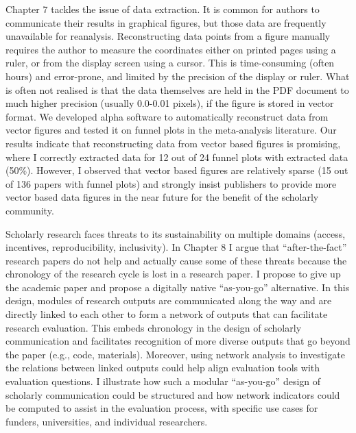 \documentclass[a5paper]{book}
\begin{document}
Chapter 7 tackles the issue of data extraction. It is common for authors
to communicate their results in graphical figures, but those data are
frequently unavailable for reanalysis. Reconstructing data points from a
figure manually requires the author to measure the coordinates either on
printed pages using a ruler, or from the display screen using a cursor.
This is time-consuming (often hours) and error-prone, and limited by the
precision of the display or ruler. What is often not realised is that
the data themselves are held in the PDF document to much higher
precision (usually 0.0-0.01 pixels), if the figure is stored in vector
format. We developed alpha software to automatically reconstruct data
from vector figures and tested it on funnel plots in the meta-analysis
literature. Our results indicate that reconstructing data from vector
based figures is promising, where I correctly extracted data for 12 out
of 24 funnel plots with extracted data (50\%). However, I observed that
vector based figures are relatively sparse (15 out of 136 papers with
funnel plots) and strongly insist publishers to provide more vector
based data figures in the near future for the benefit of the scholarly
community.

Scholarly research faces threats to its sustainability on multiple
domains (access, incentives, reproducibility, inclusivity). In Chapter 8
I argue that \enquote{after-the-fact} research papers do not help and
actually cause some of these threats because the chronology of the
research cycle is lost in a research paper. I propose to give up the
academic paper and propose a digitally native \enquote{as-you-go}
alternative. In this design, modules of research outputs are
communicated along the way and are directly linked to each other to form
a network of outputs that can facilitate research evaluation. This
embeds chronology in the design of scholarly communication and
facilitates recognition of more diverse outputs that go beyond the paper
(e.g., code, materials). Moreover, using network analysis to investigate
the relations between linked outputs could help align evaluation tools
with evaluation questions. I illustrate how such a modular
\enquote{as-you-go} design of scholarly communication could be
structured and how network indicators could be computed to assist in the
evaluation process, with specific use cases for funders, universities,
and individual researchers.
\end{document}
